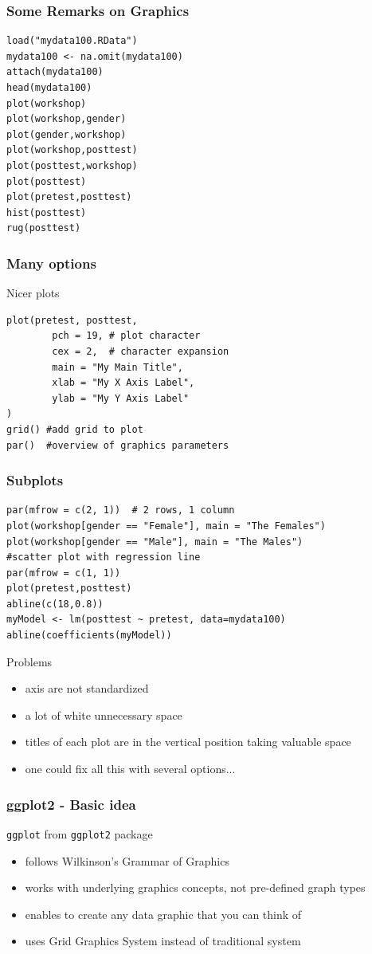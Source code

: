 \documentclass[xcolor={svgnames},10pt,
handout
]{beamer}
\begin{document}
\begin{frame}[fragile]\frametitle{Some Remarks on Graphics}
\begin{lstlisting}
load("mydata100.RData")
mydata100 <- na.omit(mydata100)
attach(mydata100)
head(mydata100)
plot(workshop)
plot(workshop,gender)
plot(gender,workshop)
plot(workshop,posttest)
plot(posttest,workshop)
plot(posttest)
plot(pretest,posttest)
hist(posttest)
rug(posttest)
\end{lstlisting}
\end{frame}

\begin{frame}[fragile]\frametitle{Many options}
Nicer plots
\begin{lstlisting}
plot(pretest, posttest,
		pch = 19, # plot character
		cex = 2,  # character expansion
		main = "My Main Title",
		xlab = "My X Axis Label",
		ylab = "My Y Axis Label"
)
grid() #add grid to plot
par()  #overview of graphics parameters
\end{lstlisting}
\end{frame}

\begin{frame}[fragile]\frametitle{Subplots}\footnotesize
\begin{lstlisting}
par(mfrow = c(2, 1))  # 2 rows, 1 column
plot(workshop[gender == "Female"], main = "The Females")
plot(workshop[gender == "Male"], main = "The Males")
#scatter plot with regression line
par(mfrow = c(1, 1))
plot(pretest,posttest)
abline(c(18,0.8))
myModel <- lm(posttest ~ pretest, data=mydata100)
abline(coefficients(myModel))
\end{lstlisting}
Problems
\begin{itemize}
\item axis are not standardized
\item a lot of white unnecessary space
\item titles of each plot are in the vertical position taking valuable space
\item one could fix all this with several options...
\end{itemize}
\end{frame}

\begin{frame}[fragile]\frametitle{ggplot2 - Basic idea}
\lstinline|ggplot| from \texttt{ggplot2} package
\begin{itemize}
	\item follows Wilkinson's Grammar of Graphics
	\item works with underlying graphics concepts, not pre-defined graph types
	\item enables to create any data graphic that you can think of
	\item uses Grid Graphics System instead of traditional system
\end{itemize}
\end{frame}
\end{document}
